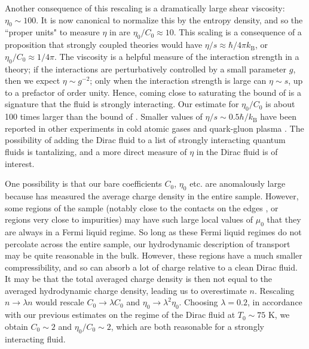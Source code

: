 Another consequence of this rescaling is a dramatically large shear viscosity:  $\eta_0\sim 100$.   It is now canonical to normalize this by the entropy density, and so the ``proper units" to measure $\eta$ in are $\eta_0/C_0\approx 10$.   This scaling is a consequence of a proposition \cite{kovtun_viscosity_2005} that strongly coupled theories would have $\eta/s \approx \hbar/4\pi k_{\mathrm{B}}$, or $\eta_0/C_0 \approx 1/4\pi$.  The viscosity is a helpful measure of the interaction strength in a theory;  if the interactions are perturbatively controlled by a small parameter $g$, then we expect $\eta \sim g^{-2}$;  only when the interaction strength is large can $\eta \sim s$, up to a prefactor of order unity.  Hence, coming close to saturating the bound of \cite{kovtun_viscosity_2005} is a signature that the fluid is strongly interacting. Our estimate for $\eta_0/C_0$ is about 100 times larger than the bound of \cite{kovtun_viscosity_2005}.   Smaller values of $\eta/s \sim 0.5 \hbar /k_{\mathrm{B}}$ have been reported in other experiments in cold atomic gases \cite{cao_universal_2011} and quark-gluon plasma \cite{luzum_conformal_2008}.   The possibility of adding the Dirac fluid to a list of strongly interacting quantum fluids is tantalizing, and a more direct measure of $\eta$ in the Dirac fluid is of interest. 

One possibility is that our bare coefficients $C_0$, $\eta_0$ etc. are anomalously large because \cite{crossno_observation_2016} has measured the average charge density in the entire sample.   However, some regions of the sample (notably close to the contacts on the edges \cite{huard_evidence_2008}, or regions very close to impurities) may have such large local values of $\mu_0$ that they are always in a Fermi liquid regime.  So long as these Fermi liquid regimes do not percolate across the entire sample, our hydrodynamic description of transport may be quite reasonable in the bulk.  However, these regions have a much smaller compressibility, and so can absorb a lot of charge relative to a clean Dirac fluid.    It may be that the total averaged charge density is then not equal to the averaged hydrodynamic charge density,  leading us to overestimate $n$.   Rescaling $n \rightarrow \lambda n$ would rescale $C_0 \rightarrow \lambda C_0$ and $\eta_0 \rightarrow \lambda^2 \eta_0$.   Choosing $\lambda = 0.2$, in accordance with our previous estimates on the regime of the Dirac fluid at $T_0\sim 75$ K, we obtain $C_0\sim 2$ and $\eta_0/C_0 \sim 2$, which are both reasonable for a strongly interacting fluid.   

